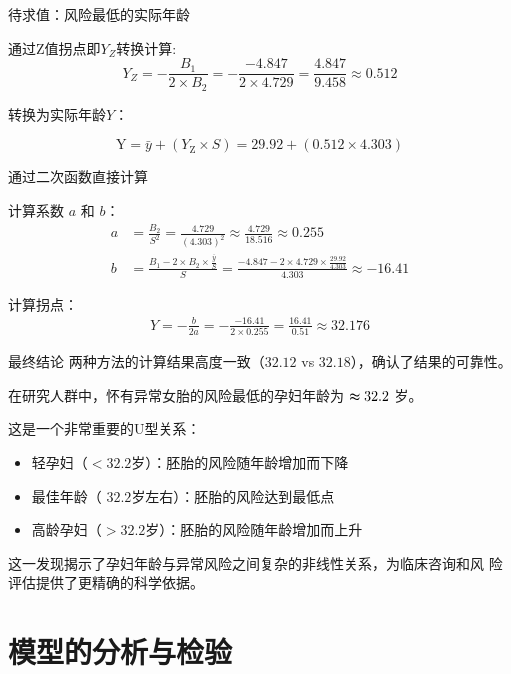 \documentclass[withoutpreface,notoc]{cumcmthesis}
\begin{document}
	待求值：风险最低的实际年龄

	通过Z值拐点即$Y_{Z}$转换计算:
	\begin{equation}
	Y_{Z} = -\frac{B_1}{2 \times B_2} = -\frac{-4.847}{2 \times 4.729} = \frac{4.847}{9.458} \approx 0.512
	\end{equation}

	转换为实际年龄$Y$：

	\begin{equation}
	\text{Y} = \bar{y} + (Y_{\text{Z}} \times S) = 29.92 + (0.512 \times 4.303)
	\end{equation}

	通过二次函数直接计算

	计算系数 $a$ 和 $b$：
	\begin{align}
	a &= \frac{B_2}{S^2} = \frac{4.729}{(4.303)^2} \approx \frac{4.729}{18.516} \approx 0.255 \\
	b &= \frac{B_1 - 2 \times B_2 \times \frac{\bar{y}}{S}}{S} = \frac{-4.847 - 2 \times 4.729 \times \frac{29.92}{4.303}}{4.303} \approx -16.41
	\end{align}

	计算拐点：
	\begin{align}
	Y = -\frac{b}{2a} = -\frac{-16.41}{2 \times 0.255} = \frac{16.41}{0.51} \approx 32.176
	\end{align}

	最终结论
	两种方法的计算结果高度一致（$32.12$ vs $32.18$），确认了结果的可靠性。

	在研究人群中，怀有异常女胎的风险最低的孕妇年龄为  $\thickapprox 32.2$ 岁。

	这是一个非常重要的U型关系：

	\begin{itemize}
	\item 轻孕妇（$<32.2$岁）：胚胎的风险随年龄增加而下降
	\item 最佳年龄（ $32.2$岁左右）：胚胎的风险达到最低点
	\item 高龄孕妇（$>32.2$岁）：胚胎的风险随年龄增加而上升
	\end{itemize}

	这一发现揭示了孕妇年龄与异常风险之间复杂的非线性关系，为临床咨询和风
	险评估提供了更精确的科学依据。











	
	\section{模型的分析与检验}
\end{document}
